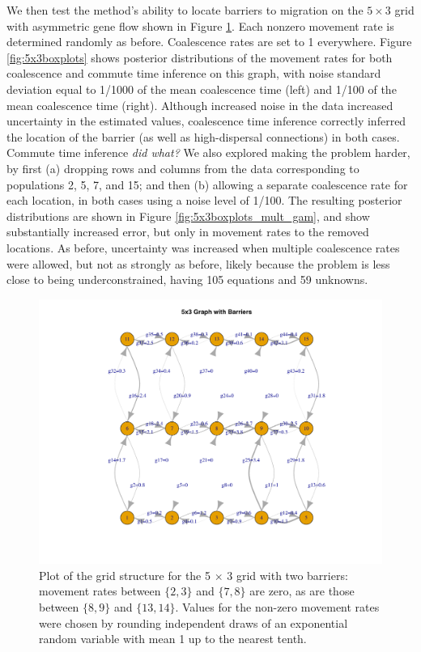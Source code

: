 \documentclass{article}
\newcommand{\plr}[1]{{\em \color{blue} #1}}
\begin{document}
We then test the method's ability to locate barriers to migration
on the $5 \times 3$ grid with asymmetric gene flow shown in Figure \ref{fig:5x3b_grid}. 
Each nonzero movement rate is determined randomly as before.
Coalescence rates are set to 1 everywhere.
Figure \ref{fig:5x3boxplots} shows posterior distributions of the movement rates
for both coalescence and commute time inference
on this graph, with noise standard deviation equal to
1/1000 of the mean coalescence time (left)
and 1/100 of the mean coalescence time (right).
Although increased noise in the data increased uncertainty in the estimated values,
coalescence time inference correctly inferred the location of the barrier
(as well as high-dispersal connections) in both cases.
Commute time inference \plr{did what?}
We also explored making the problem harder,
by first (a) dropping rows and columns from the data corresponding to populations 2, 5, 7, and 15;
and then (b) allowing a separate coalescence rate for each location,
in both cases using a noise level of 1/100.
The resulting posterior distributions are shown in Figure \ref{fig:5x3boxplots_mult_gam},
and show substantially increased error,
but only in movement rates to the removed locations.
As before, uncertainty was increased when multiple coalescence rates were allowed,
but not as strongly as before, likely because the problem is less close to being underconstrained,
having 105 equations and 59 unknowns.


\begin{figure}
\centering
     \includegraphics[scale=.6]{figs/5x3b_grid}
    \caption{Plot of the grid structure 
    for the 5 $\times$ 3 grid with two barriers:
    movement rates between $\{2,3\}$ and $\{7,8\}$ are zero,
    as are those between $\{8,9\}$ and $\{13,14\}$.
    Values for the non-zero movement rates 
    were chosen by rounding independent draws of an exponential random variable with mean 1 
    up to the nearest tenth.}
    \label{fig:5x3b_grid}
\end{figure}
\end{document}
